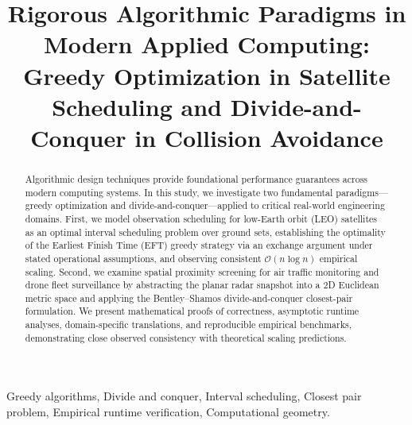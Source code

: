 \documentclass[conference]{IEEEtran}
\begin{document}
\title{Rigorous Algorithmic Paradigms in Modern Applied Computing: Greedy Optimization in Satellite Scheduling and Divide-and-Conquer in Collision Avoidance}

\author{
\and
{}
}

\maketitle

\begin{abstract}
Algorithmic design techniques provide foundational performance guarantees across modern computing systems. In this study, we investigate two fundamental paradigms---greedy optimization and divide-and-conquer---applied to critical real-world engineering domains. First, we model observation scheduling for low-Earth orbit (LEO) satellites as an optimal interval scheduling problem over ground sets, establishing the optimality of the Earliest Finish Time (EFT) greedy strategy via an exchange argument under stated operational assumptions, and observing consistent $\mathcal{O}(n \log n)$ empirical scaling. Second, we examine spatial proximity screening for air traffic monitoring and drone fleet surveillance by abstracting the planar radar snapshot into a 2D Euclidean metric space and applying the Bentley--Shamos divide-and-conquer closest-pair formulation. We present mathematical proofs of correctness, asymptotic runtime analyses, domain-specific translations, and reproducible empirical benchmarks, demonstrating close observed consistency with theoretical scaling predictions.
\end{abstract}

\begin{IEEEkeywords}
Greedy algorithms, Divide and conquer, Interval scheduling, Closest pair problem, Empirical runtime verification, Computational geometry.
\end{IEEEkeywords}









\appendices


\end{document}
